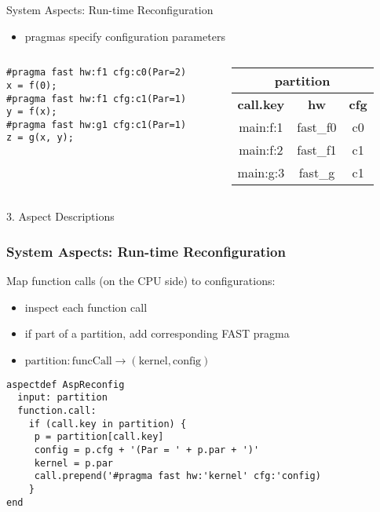 \begin{frame}[fragile]{System Aspects: Run-time Reconfiguration}
  \begin{itemize}
    \setlength{\itemsep}{8pt}
  \item pragmas specify configuration parameters
\end{itemize}
    \begin{columns}
      \begin{column}{.7\textwidth}
        \begin{center}
          \begin{lstlisting}[style=MaxC]
#pragma fast hw:f1 cfg:c0(Par=2)
x = f(0);
#pragma fast hw:f1 cfg:c1(Par=1)
y = f(x);
#pragma fast hw:g1 cfg:c1(Par=1)
z = g(x, y);
          \end{lstlisting}
        \end{center}
      \end{column}
      \begin{column}{.3\textwidth}
        {\footnotesize
          \begin{table}[!h]
            \renewcommand{\arraystretch}{1.3}
            \hspace{-2cm}
            \begin{tabular}{c|c|c}
              \multicolumn{3}{c}{\bf{partition}} \\
              \hline
              \bf{call.key} & \bf{hw} & \bf{cfg}  \\
              \hline
              main:f:1 & fast\_f0 & c0 \\
              main:f:2 & fast\_f1 & c1 \\
              main:g:3 & fast\_g & c1 \\
            \end{tabular}
          \end{table}
        }
      \end{column}
    \end{columns}

\end{frame}

\begin{frame}[fragile]{3. Aspect Descriptions}
  \frametitle{ System Aspects: Run-time Reconfiguration}
  Map function calls (on the CPU side) to configurations:
  \begin{itemize}
  \item inspect each function call
  \item if part of a partition, add corresponding FAST pragma
  \item $ \text{partition} : \text{funcCall} \rightarrow (\text{kernel}, \text{config}) $
  \end{itemize}

  \begin{lstlisting}[style=lara]
aspectdef AspReconfig
  input: partition
  function.call:
    if (call.key in partition) {
     p = partition[call.key]
     config = p.cfg + '(Par = ' + p.par + ')'
     kernel = p.par
     call.prepend('#pragma fast hw:'kernel' cfg:'config)
    }
end
  \end{lstlisting}
\end{frame}

